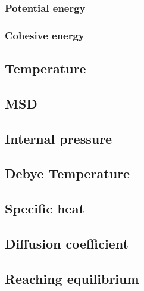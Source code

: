 \subsubsection{Potential energy}
\subsubsection{Cohesive energy}
\subsection{Temperature}
\subsection{MSD}
\subsection{Internal pressure}
\subsection{Debye Temperature}
\subsection{Specific heat}
\subsection{Diffusion coefficient}
\subsection{Reaching equilibrium}
